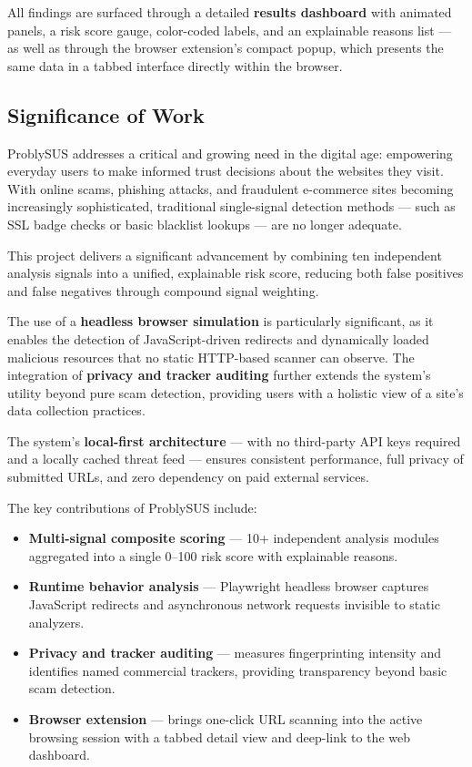 All findings are surfaced through a detailed \textbf{results dashboard} with animated panels, a risk score gauge, color-coded labels, and an explainable reasons list — as well as through the browser extension's compact popup, which presents the same data in a tabbed interface directly within the browser.

\subsection{Significance of Work}

ProblySUS addresses a critical and growing need in the digital age: empowering everyday users to make informed trust decisions about the websites they visit. With online scams, phishing attacks, and fraudulent e-commerce sites becoming increasingly sophisticated, traditional single-signal detection methods — such as SSL badge checks or basic blacklist lookups — are no longer adequate.

This project delivers a significant advancement by combining ten independent analysis signals into a unified, explainable risk score, reducing both false positives and false negatives through compound signal weighting.

The use of a \textbf{headless browser simulation} is particularly significant, as it enables the detection of JavaScript-driven redirects and dynamically loaded malicious resources that no static HTTP-based scanner can observe. The integration of \textbf{privacy and tracker auditing} further extends the system's utility beyond pure scam detection, providing users with a holistic view of a site's data collection practices.

The system's \textbf{local-first architecture} — with no third-party API keys required and a locally cached threat feed — ensures consistent performance, full privacy of submitted URLs, and zero dependency on paid external services.

The key contributions of ProblySUS include:

\begin{itemize}
\item \textbf{Multi-signal composite scoring} — 10+ independent analysis modules aggregated into a single 0–100 risk score with explainable reasons.
\item \textbf{Runtime behavior analysis} — Playwright headless browser captures JavaScript redirects and asynchronous network requests invisible to static analyzers.
\item \textbf{Privacy and tracker auditing} — measures fingerprinting intensity and identifies named commercial trackers, providing transparency beyond basic scam detection.
\item \textbf{Browser extension} — brings one-click URL scanning into the active browsing session with a tabbed detail view and deep-link to the web dashboard.
\end{itemize}